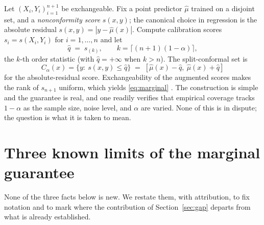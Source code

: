 \documentclass[11pt]{article}
\theoremstyle{definition}
\begin{document}
Let $(X_i,Y_i)_{i=1}^{n+1}$ be exchangeable. Fix a point predictor $\hat\mu$ trained on
a disjoint set, and a \emph{nonconformity score} $s(x,y)$; the canonical choice in
regression is the absolute residual $s(x,y)=|y-\hat\mu(x)|$. Compute calibration
scores $s_i=s(X_i,Y_i)$ for $i=1,\dots,n$ and let
\begin{equation}\label{eq:q}
  \hat q \;=\; s_{(k)}, \qquad k=\big\lceil (n+1)(1-\alpha)\big\rceil,
\end{equation}
the $k$-th order statistic (with $\hat q=+\infty$ when $k>n$). The split-conformal set is
\begin{equation}\label{eq:set}
  C_\alpha(x)=\{y:\ s(x,y)\le \hat q\}
  \;=\;[\hat\mu(x)-\hat q,\ \hat\mu(x)+\hat q]
\end{equation}
for the absolute-residual score. Exchangeability of the augmented scores makes the rank
of $s_{n+1}$ uniform, which yields \eqref{eq:marginal}
\citep{vovk2005algorithmic,lei2018distribution}. The construction is simple and the
guarantee is real, and one readily verifies that empirical coverage tracks $1-\alpha$ as
the sample size, noise level, and $\alpha$ are varied. None of this is in dispute; the
question is what it is taken to mean.

\section{Three known limits of the marginal guarantee}\label{sec:marginal}

None of the three facts below is new. We restate them, with attribution, to fix notation
and to mark where the contribution of Section~\ref{sec:gap} departs from what is already
established.
\end{document}
